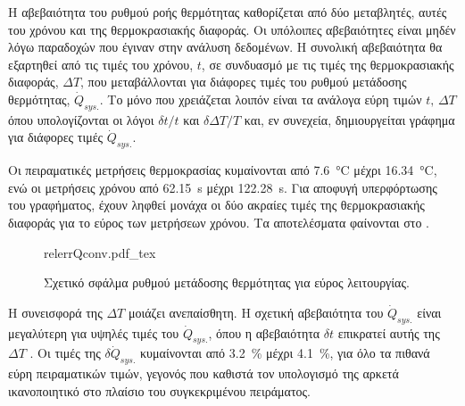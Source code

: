 \noindent Η αβεβαιότητα του ρυθμού ροής θερμότητας καθορίζεται από δύο μεταβλητές, αυτές του χρόνου και της θερμοκρασιακής διαφοράς. Οι υπόλοιπες αβεβαιότητες είναι μηδέν λόγω παραδοχών που έγιναν στην ανάλυση δεδομένων. Η συνολική αβεβαιότητα θα εξαρτηθεί από τις τιμές του χρόνου, $t$, σε συνδυασμό με τις τιμές της θερμοκρασιακής διαφοράς, $\Delta T$, που μεταβάλλονται για διάφορες τιμές του ρυθμού μετάδοσης θερμότητας, $\dot{Q}_{sys.}$. Το μόνο που χρειάζεται λοιπόν είναι τα ανάλογα εύρη τιμών $t, \, \Delta T$ όπου υπολογίζονται οι λόγοι $\delta t / t$ και $\delta \Delta T / T$ και, εν συνεχεία, δημιουργείται γράφημα για διάφορες τιμές $\dot{Q}_{sys.}$.

Οι πειραματικές μετρήσεις θερμοκρασίας κυμαίνονται από \qty{7,6}{\degreeCelsius} μέχρι \qty{16.34}{\degreeCelsius}, ενώ οι μετρήσεις χρόνου από \qty{62.15}{\second} μέχρι \qty{122.28}{\second}. Για αποφυγή υπερφόρτωσης του γραφήματος, έχουν ληφθεί μονάχα οι δύο ακραίες τιμές της θερμοκρασιακής διαφοράς για το εύρος των μετρήσεων χρόνου. Τα αποτελέσματα φαίνονται στο .

\begin{figure}[!htbp]
\centering
{relerrQconv.pdf_tex}
\caption{Σχετικό σφάλμα ρυθμού μετάδοσης θερμότητας για εύρος λειτουργίας.}\label{plt:htrateE}
\end{figure}

Η συνεισφορά της $\Delta T$ μοιάζει ανεπαίσθητη. Η σχετική αβεβαιότητα του $\dot{Q}_{sys.}$ είναι μεγαλύτερη για υψηλές τιμές του $\dot{Q}_{sys.}$, όπου η αβεβαιότητα $\delta t$ επικρατεί αυτής της $\Delta T$ . Οι τιμές της $\delta \dot{Q}_{sys.}$ κυμαίνονται από \qty{3.2}{\percent} μέχρι \qty{4.1}{\percent}, για όλο τα πιθανά εύρη πειραματικών τιμών, γεγονός που καθιστά τον υπολογισμό της αρκετά ικανοποιητικό στο πλαίσιο του συγκεκριμένου πειράματος. 